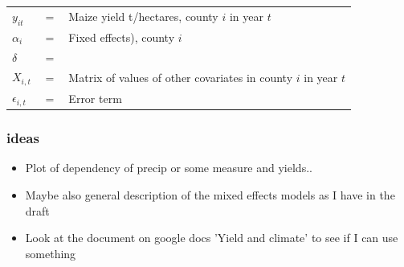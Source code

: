 \documentclass{beamer}              %
\begin{document}
\begin{frame}
\begin{table}
\begin{small}
\begin{tabular}{lll}
$y_{it}$ &$=$& Maize yield t/hectares, county $i$ in year $t$\\
$\alpha_i$ &$=$& Fixed effects), county $i$\\
{\color{darkblue}$\delta$ }&{\color{darkblue}$=$}&{\color{darkblue}{Effect of drought on economy}}\\

$X_{i,t}$ &$=$& Matrix of values of other covariates in county $i$ in year $t$\\
$\epsilon_{i,t}$ &$=$& Error term \\
\end{tabular}
\end{small}
\end{table}

\end{frame}








\begin{frame}

\frametitle{ideas}

\begin{itemize}
\color{red}
\item Plot of dependency of precip or some measure and yields..
\item Maybe also general description of the mixed effects models as I have in the draft
\item Look at the document on google docs 'Yield and climate' to see if I can use something
\end{itemize}
\color{black}
\end{frame}

\end{document}
